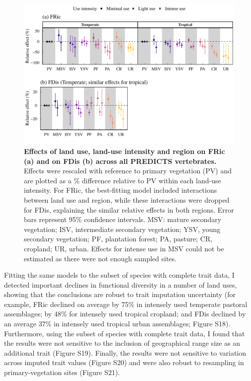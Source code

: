 \begin{figure}[h!]
\centering
\includegraphics[scale=0.75]{figures/Chapter_FD/Figure2}
\caption[Effects of land use, land-use intensity and region on FRic (a) and on FDis (b) across all PREDICTS vertebrates.]{\textbf{ Effects of land use, land-use intensity and region on FRic (a) and on FDis (b) across all PREDICTS vertebrates.} Effects were rescaled with reference to primary vegetation (PV) and are plotted as a \% difference relative to PV within each land-use intensity. For FRic, the best-fitting model included interactions between land use and region, while these interactions were dropped for FDis, explaining the similar relative effects in both regions. Error bars represent 95\% confidence intervals. MSV: mature secondary vegetation; ISV, intermediate secondary vegetation; YSV, young secondary vegetation; PF, plantation forest; PA, pasture; CR, cropland; UR, urban. Effects for intense use in MSV could not be estimated as there were not enough sampled sites.}
\label{chap3_fig2}
\end{figure}

Fitting the same models to the subset of species with complete trait data, I detected important declines in functional diversity in a number of land uses, showing that the conclusions are robust to trait imputation uncertainty (for example, FRic declined on average by 75\% in intensely used temperate pastoral assemblages; by 48\% for intensely used tropical cropland; and FDis declined by an average 37\% in intensely used tropical urban assemblages; Figure S18). Furthermore, using the subset of species with complete trait data, I found that the results were not sensitive to the inclusion of geographical range size as an additional trait (Figure S19). Finally, the results were not sensitive to variation across imputed trait values (Figure S20) and were also robust to resampling in primary-vegetation sites (Figure S21).

